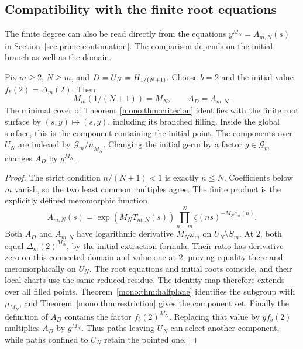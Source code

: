 \subsection{Compatibility with the finite root equations}

The finite degree can also be read directly from the equations
\(y^{M_N}=A_{m,N}(s)\) in Section~\ref{sec:prime-continuation}.
The comparison depends on the initial branch as well as the domain.

\begin{proposition}
\label{prop:finite-root-comparison}
Fix \(m\geq2\), \(N\geq m\), and \(D=U_N=H_{1/(N+1)}\).
Choose \(b=2\) and the initial value \(f_b(2)=\Delta_m(2)\).
Then
\[
 M_m(1/(N+1))=M_N,\qquad A_D=A_{m,N}.
\]
The minimal cover of Theorem~\ref{mono:thm:criterion} identifies with the
finite root surface by \((s,y)\mapsto(s,y)\), including its branched filling.
Inside the global surface, this is the component containing the initial
point.  The components over \(U_N\) are indexed by
\(\mathcal G_m/\mu_{M_N}\).
Changing the initial germ by a factor \(g\in\mathcal G_m\) changes
\(A_D\) by \(g^{M_N}\).
\end{proposition}

\begin{proof}
The strict condition \(n/(N+1)<1\) is exactly \(n\leq N\).
Coefficients below \(m\) vanish, so the two least common multiples agree.
The finite product is the explicitly defined meromorphic function
\[
 A_{m,N}(s)=\exp(M_NT_{m,N}(s))
       \prod_{n=m}^N\zeta(ns)^{-M_Nc_m(n)}.
\]
Both \(A_D\) and \(A_{m,N}\) have logarithmic derivative \(M_N\omega_m\)
on \(U_N\setminus S_m\).
At \(2\), both equal \(\Delta_m(2)^{M_N}\), by the initial extraction
formula.  Their ratio has derivative zero on this connected domain and
value one at \(2\), proving equality there and meromorphically on \(U_N\).
The root equations and initial roots coincide, and their local charts use
the same reduced residue.  The identity map therefore extends over all
filled points.
Theorem~\ref{mono:thm:halfplane} identifies the subgroup with \(\mu_{M_N}\),
and Theorem~\ref{mono:thm:restriction} gives the component set.
Finally the definition of \(A_D\) contains the factor \(f_b(2)^{M_N}\).
Replacing that value by \(g f_b(2)\) multiplies \(A_D\) by \(g^{M_N}\).
Thus paths leaving \(U_N\) can select another component, while paths
confined to \(U_N\) retain the pointed one.
\end{proof}

